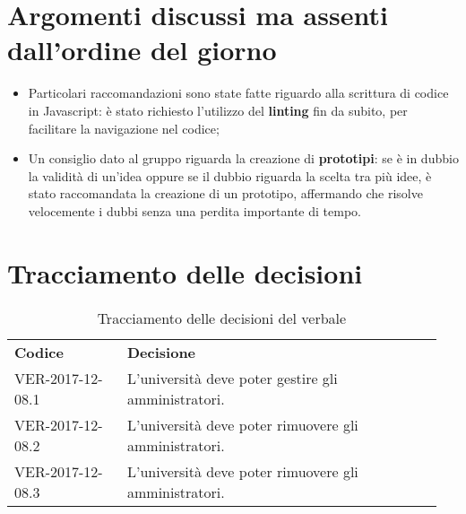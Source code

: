 \documentclass[VER-2017-12-08.tex]{subfiles}
\begin{document}
\section{Argomenti discussi ma assenti dall'ordine del giorno}
\begin{itemize}
	\item Particolari raccomandazioni sono state fatte riguardo alla scrittura di codice in Javascript: è stato richiesto l'utilizzo del \textbf{linting} fin da subito, per facilitare la navigazione nel codice;
	\item Un consiglio dato al gruppo riguarda la creazione di \textbf{prototipi}: se è in dubbio la validità di un'idea oppure se il dubbio riguarda la scelta tra più idee, è stato raccomandata la creazione di un prototipo, affermando che risolve velocemente i dubbi senza una perdita importante di tempo.
\end{itemize}
\section{Tracciamento delle decisioni}
\begin{table}[H]
	\begin{center}
		\begin{tabu} to 
			\tableHeaderStyle
			\textbf{Codice} & \textbf{Decisione} \\
			VER-2017-12-08.1 & L'università deve poter gestire gli amministratori. \\
			VER-2017-12-08.2 & L'università deve poter rimuovere gli amministratori. \\
			VER-2017-12-08.3 & L'università deve poter rimuovere gli amministratori. \\
		\end{tabu}
	\caption{Tracciamento delle decisioni del verbale}
	\end{center}
\end{table}
\end{document}

